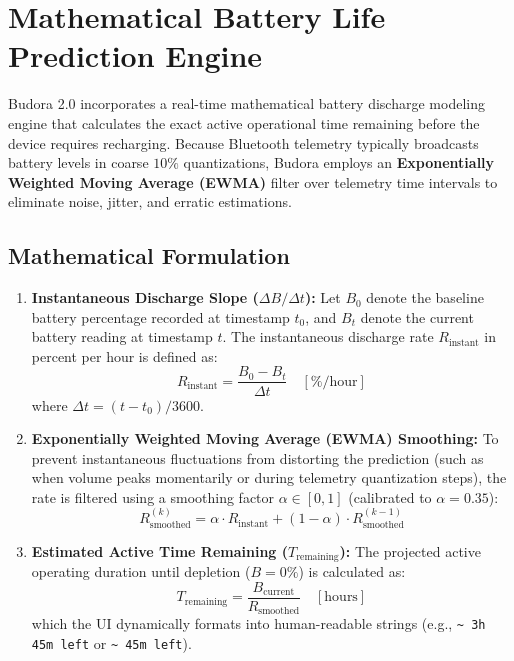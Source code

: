 \documentclass[11pt,a4paper]{article}
\begin{document}
\section{Mathematical Battery Life Prediction Engine}

Budora 2.0 incorporates a real-time mathematical battery discharge modeling engine that calculates the exact active operational time remaining before the device requires recharging. Because Bluetooth telemetry typically broadcasts battery levels in coarse $10\%$ quantizations, Budora employs an \textbf{Exponentially Weighted Moving Average (EWMA)} filter over telemetry time intervals to eliminate noise, jitter, and erratic estimations.

\subsection{Mathematical Formulation}

\begin{enumerate}
    \item \textbf{Instantaneous Discharge Slope ($\Delta B / \Delta t$):}
    Let $B_0$ denote the baseline battery percentage recorded at timestamp $t_0$, and $B_t$ denote the current battery reading at timestamp $t$. The instantaneous discharge rate $R_{\text{instant}}$ in percent per hour is defined as:
    \begin{equation}
        R_{\text{instant}} = \frac{B_0 - B_t}{\Delta t} \quad \left[\% / \text{hour}\right]
    \end{equation}
    where $\Delta t = (t - t_0) / 3600$.

    \item \textbf{Exponentially Weighted Moving Average (EWMA) Smoothing:}
    To prevent instantaneous fluctuations from distorting the prediction (such as when volume peaks momentarily or during telemetry quantization steps), the rate is filtered using a smoothing factor $\alpha \in [0, 1]$ (calibrated to $\alpha = 0.35$):
    \begin{equation}
        R_{\text{smoothed}}^{(k)} = \alpha \cdot R_{\text{instant}} + (1 - \alpha) \cdot R_{\text{smoothed}}^{(k-1)}
    \end{equation}

    \item \textbf{Estimated Active Time Remaining ($T_{\text{remaining}}$):}
    The projected active operating duration until depletion ($B = 0\%$) is calculated as:
    \begin{equation}
        T_{\text{remaining}} = \frac{B_{\text{current}}}{R_{\text{smoothed}}} \quad [\text{hours}]
    \end{equation}
    which the UI dynamically formats into human-readable strings (e.g., \texttt{\~{} 3h 45m left} or \texttt{\~{} 45m left}).
\end{enumerate}
\end{document}
